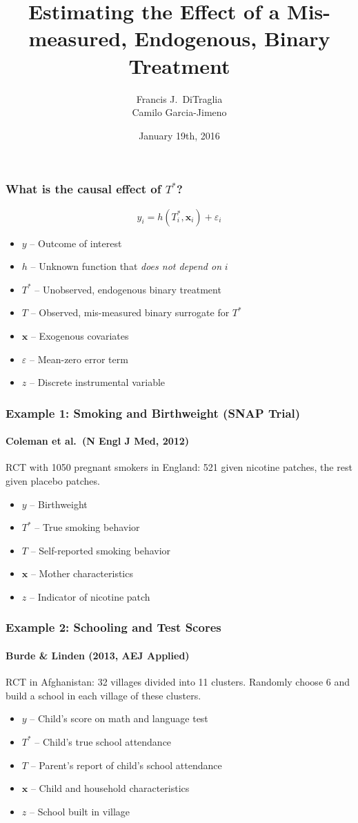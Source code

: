 \documentclass{beamer}
\title[Binary Regressors]{Estimating the Effect of a Mis-measured, Endogenous, Binary Treatment}
\author[FJ DiTraglia]{Francis J.\ DiTraglia\\ Camilo Garcia-Jimeno}
\institute{University of Pennsylvania}
\date{January 19th, 2016}
\begin{document}
 

\begin{frame}[plain]
	\titlepage 
\end{frame} 
\begin{frame}
  \frametitle{What is the causal effect of $T^*$?}
  \[ y_i = h(T^*_i, \mathbf{x}_i) + \varepsilon_i\]
  \begin{itemize}
    \item $y$ -- Outcome of interest
    \item $h$ -- Unknown function that \emph{does not depend on} $i$
    \item $T^*$ -- Unobserved, endogenous binary treatment
    \item $T$ -- Observed, mis-measured binary surrogate for $T^*$
    \item $\mathbf{x}$ -- Exogenous covariates
    \item $\varepsilon$ -- Mean-zero error term
    \item $z$ -- Discrete instrumental variable
  \end{itemize}
\end{frame}
\begin{frame}
  \frametitle{Example 1: Smoking and Birthweight (SNAP Trial)}
\framesubtitle{Coleman et al.\ (N Engl J Med, 2012)}
  RCT with 1050 pregnant smokers in England: 521 given nicotine patches, the rest given placebo patches.
\begin{itemize}
  \item $y$ -- Birthweight 
  \item $T^*$ -- True smoking behavior 
  \item $T$ -- Self-reported smoking behavior
  \item $\mathbf{x}$ -- Mother characteristics
  \item $z$ -- Indicator of nicotine patch
\end{itemize}
   
\end{frame}
\begin{frame}
  \frametitle{Example 2: Schooling and Test Scores}
\framesubtitle{Burde \& Linden (2013, AEJ Applied)}
  RCT in Afghanistan: 32 villages divided into 11 clusters. Randomly choose 6 and build a school in each village of these clusters.

\begin{itemize}
  \item $y$ -- Child's score on math and language test 
  \item $T^*$ -- Child's true school attendance
  \item $T$ -- Parent's report of child's school attendance
  \item $\mathbf{x}$ -- Child and household characteristics
  \item $z$ -- School built in village
\end{itemize}
\end{frame}
\end{document}
